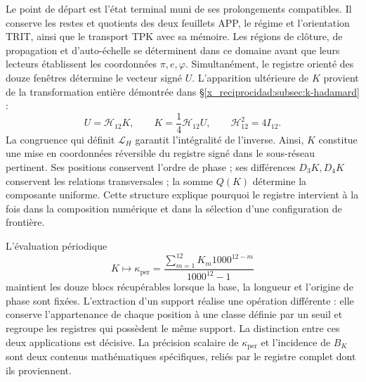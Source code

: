 Le point de départ est l'état terminal muni de ses prolongements
compatibles. Il conserve les restes et quotients des deux feuillets
APP, le régime et l'orientation TRIT, ainsi que le transport TPK avec sa mémoire.
Les régions de clôture, de propagation et d'auto-échelle se déterminent dans ce
domaine avant que leurs lecteurs établissent les coordonnées
$\pi,e,\varphi$. Simultanément, le registre orienté des douze
fenêtres détermine le vecteur signé $U$. L'apparition ultérieure de $K$
provient de la transformation entière démontrée dans
\S\ref{x_reciprocidad:subsec:k-hadamard} :
\begin{equation}
 U=\mathcal H_{12}K,\qquad
 K=\frac14\mathcal H_{12}U,\qquad
 \mathcal H_{12}^{2}=4I_{12}.
 \label{x_reciprocidad:inc-ampl-registro}
\end{equation}
La congruence qui définit $\mathcal L_H$ garantit l'intégralité de
l'inverse. Ainsi, $K$ constitue une mise en coordonnées réversible
du registre signé dans le sous-réseau pertinent. Ses positions conservent
l'ordre de phase ; ses différences $D_3K,D_4K$ conservent les relations
transversales ; la somme $Q(K)$ détermine la composante uniforme. Cette
structure explique pourquoi le registre intervient à la fois dans la composition
numérique et dans la sélection d'une configuration de frontière.

L'évaluation périodique
\[
 K\longmapsto\kappa_{\mathrm{per}}
 =\frac{\sum_{m=1}^{12}K_m1000^{12-m}}{1000^{12}-1}
\]
maintient les douze blocs récupérables lorsque la base, la longueur et
l'origine de phase sont fixées. L'extraction d'un support réalise une opération
différente : elle conserve l'appartenance de chaque position à une classe définie
par un seuil et regroupe les registres qui possèdent le même support. La
distinction entre ces deux applications est décisive. La précision
scalaire de $\kappa_{\mathrm{per}}$ et l'incidence de $B_K$ sont deux
contenus mathématiques spécifiques, reliés par le registre
complet dont ils proviennent.




